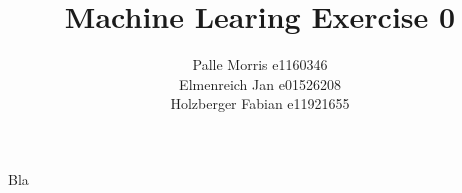\documentclass[11pt]{article}
\begin{document}
\author{Palle Morris e1160346\\ Elmenreich Jan e01526208\\ Holzberger Fabian e11921655 }
\title{Machine Learing Exercise 0}
\maketitle

\medskip

Bla
\end{document}
